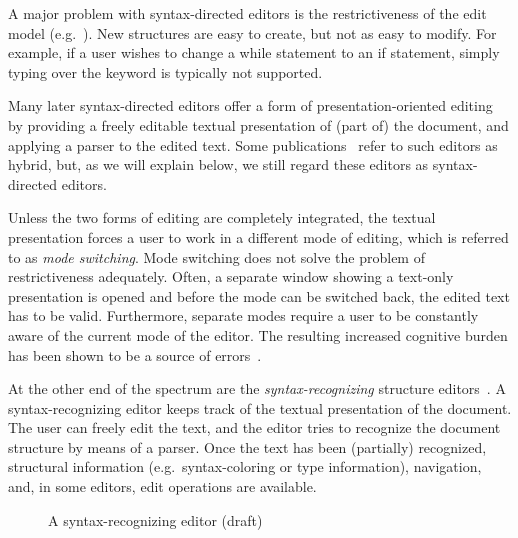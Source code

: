 A major problem with syntax-directed editors is the restrictiveness of the edit model (e.g.~\cite{vanter94practical,rubinNeal87design}). New structures are easy to create, but not as easy to modify. For example, if a user wishes to change a while statement to an if statement, simply typing over the keyword is typically not supported. 

Many later syntax-directed editors offer a form of presentation-oriented editing by providing a freely editable textual presentation of (part of) the document, and applying a parser to the edited text. Some publications~\cite{teitelbaum81progSynth, minor90editing} refer to such editors as hybrid, but, as we will explain below, we still regard these editors as syntax-directed editors. 

Unless the two forms of editing are completely integrated, the textual presentation forces a user to work in a different mode of editing, which is referred to as {\em mode switching}. Mode switching does not solve the problem of restrictiveness adequately. Often, a separate window showing a text-only presentation is opened and before the mode can be switched back, the edited text has to be valid. Furthermore, separate modes require a user to be constantly aware of the current mode of the editor. The resulting increased cognitive burden has been shown to be a source of errors~\cite{sellen90modes}.


At the other end of the spectrum are the {\em syntax-recognizing} structure editors~\cite{budinsky85sre, ballance92pan}. A syntax-recognizing editor keeps track of the textual presentation of the document. The user can freely edit the text, and the editor tries to recognize the document structure by means of a parser. Once the text has been (partially) recognized, structural information (e.g.\ syntax-coloring or type information), navigation, and, in some editors, edit operations are available.

\begin{figure}
\begin{small}
\begin{center}
\begin{center}
\begin{small}
\noindent
{}
\end{small}
\end{center}\caption{A syntax-recognizing editor (draft)}\label{synRecEdit} 
\end{center}
\end{small}
\end{figure}

